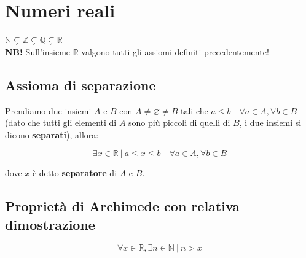 \documentclass{article}
\begin{document}
\section{Numeri reali}
$\mathbb{N} \subsetneq \mathbb{Z} \subsetneq \mathbb{Q} \subsetneq \mathbb{R}$ \\

\noindent\textbf{NB!} Sull'insieme $\mathbb{R}$ valgono tutti gli assiomi definiti precedentemente!

\subsection{Assioma di separazione}
Prendiamo due insiemi $A$ e $B$ con $A \neq \varnothing \neq B$ tali che $a \leq b \quad \forall a \in A, \forall b \in B$ (dato che tutti gli elementi di $A$ sono più piccoli di quelli di $B$, i due insiemi si dicono \textbf{separati}), allora: 

\begin{equation*}
    \exists x \in \mathbb{R} \ | \ a \leq x \leq b \quad \forall a \in A, \forall b \in B
\end{equation*}

\noindent dove $x$ è detto \textbf{separatore} di $A$ e $B$.

\subsection{Proprietà di Archimede con relativa dimostrazione}
\begin{equation*}
    \forall x \in \mathbb{R}, \exists n \in \mathbb{N} \ | \ n > x
\end{equation*}
\end{document}
